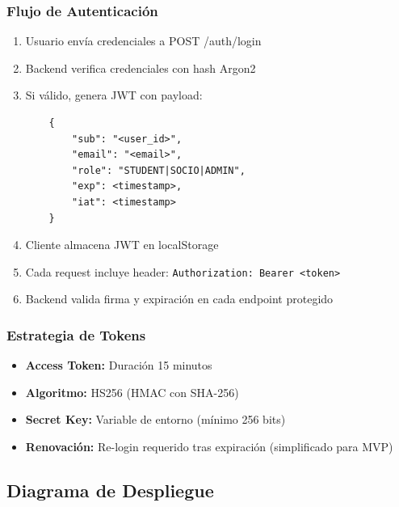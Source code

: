 \documentclass[12pt,a4paper]{article}
\begin{document}
\subsubsection{Flujo de Autenticación}

\begin{enumerate}
    \item Usuario envía credenciales a POST /auth/login
    \item Backend verifica credenciales con hash Argon2
    \item Si válido, genera JWT con payload:
    \begin{verbatim}
    {
        "sub": "<user_id>",
        "email": "<email>",
        "role": "STUDENT|SOCIO|ADMIN",
        "exp": <timestamp>,
        "iat": <timestamp>
    }
    \end{verbatim}
    \item Cliente almacena JWT en localStorage
    \item Cada request incluye header: \texttt{Authorization: Bearer <token>}
    \item Backend valida firma y expiración en cada endpoint protegido
\end{enumerate}

\subsubsection{Estrategia de Tokens}

\begin{itemize}[leftmargin=*]
    \item \textbf{Access Token:} Duración 15 minutos
    \item \textbf{Algoritmo:} HS256 (HMAC con SHA-256)
    \item \textbf{Secret Key:} Variable de entorno (mínimo 256 bits)
    \item \textbf{Renovación:} Re-login requerido tras expiración (simplificado para MVP)
\end{itemize}

\subsection{Diagrama de Despliegue}
\end{document}
